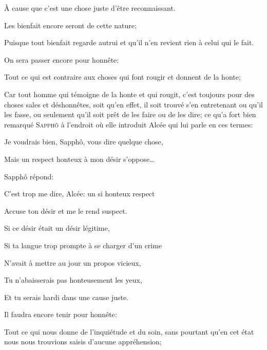 À cause que c'est une chose juste d'être reconnaissant.

\begin{lieu}
	Les bienfait encore seront de cette nature;
\end{lieu}

Puisque tout bienfait regarde autrui et qu'il n'en revient rien à celui qui le fait.

\bigbreak

On sera passer encore pour honnête:

\begin{lieu}
	Tout ce qui est contraire aux choses qui font rougir et donnent de la honte;
\end{lieu}

Car tout homme qui témoigne de la honte et qui rougit, c'est toujours pour des choses sales et déshonnêtes, soit qu'en
effet, il soit trouvé s'en entretenant ou qu'il les fasse, ou seulement qu'il soit prêt de les faire ou de les dire; ce
qu'a fort bien remarqué \textsc{Sapphô} à l'endroit où elle introduit Alcée qui lui parle en ces termes:

\begin{emphpar}
	Je voudrais bien, Sapphô, vous dire quelque chose,
	
	Mais un respect honteux à mon désir s'oppose\dots
\end{emphpar}

Sapphô répond:

\begin{emphpar}
	C'est trop me dire, Alcée: un si honteux respect

	Accuse ton désir et me le rend suspect.

	Si ce désir était un désir légitime,

	Si ta langue trop prompte à se charger d'un crime

	N'avait à mettre au jour un propos vicieux,

	Tu n'abaisserais pas honteusement les yeux,

	Et tu serais hardi dans une cause juste. 
\end{emphpar}

\bigbreak

Il faudra encore tenir pour honnête:

\begin{lieu}
	Tout ce qui nous donne de l'inquiétude et du soin, sans pourtant qu'en cet état nous nous trouvions saisis
	d'aucune appréhension;
\end{lieu}

